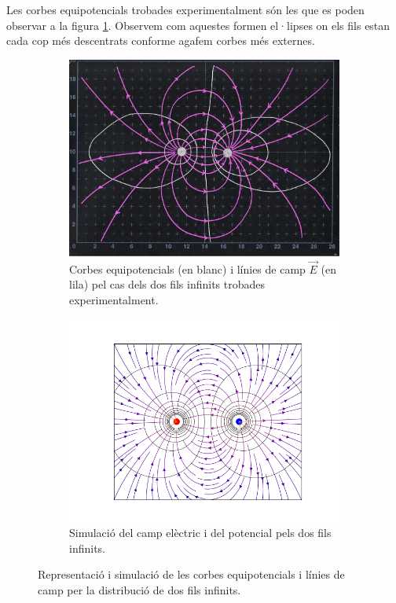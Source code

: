 \documentclass[a4paper,10.5pt]{report}
\begin{document}
Les corbes equipotencials trobades experimentalment són les que es poden observar a la figura \ref{fig:1.3a}. Observem com aquestes formen el·lipses on els fils estan cada cop més descentrats conforme agafem corbes més externes. 
\begin{figure}[h]
	\centering
	\begin{subfigure}{0.45\linewidth}
		\centering
		\includegraphics[width=\linewidth]{screenshot004}
		\caption{Corbes equipotencials (en blanc) i línies de camp $\vec{E}$ (en lila) pel cas dels dos fils infinits trobades experimentalment.}
		\label{fig:1.3a}
	\end{subfigure}
	\hfill
	\begin{subfigure}{0.5\linewidth}
		\centering
		\includegraphics[width=\linewidth]{figfils}
		\caption{Simulació del camp elèctric i del potencial pels dos fils infinits.}
		\label{fig:1.3b}
	\end{subfigure}
	\caption{Representació i simulació de les corbes equipotencials i línies de camp per la distribució de dos fils infinits.}
	\label{fig:1.3}
\end{figure}
\end{document}
